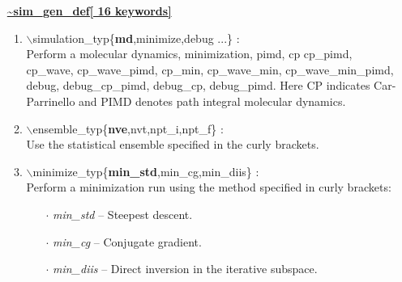 \documentclass[12pt]{article}
\begin{document}
\begin{itemize}
\huge
\item[] \underline{\bf \~{}sim\_gen\_def[ 16 keywords]}
\begin{enumerate}
 \vspace{0.15in} \Large
 \item $\backslash$simulation\_typ\{{\bf md},minimize,debug ...\} : \\
     \large
     Perform a molecular dynamics, minimization, pimd, cp
     cp\_pimd, cp\_wave, cp\_wave\_pimd, cp\_min, cp\_wave\_min,
     cp\_wave\_min\_pimd,
     debug, debug\_cp\_pimd, debug\_cp, debug\_pimd. Here CP indicates
     Car-Parrinello and PIMD  denotes path integral molecular dynamics.

 \vspace{0.15in} \Large
 \item  $\backslash$ensemble\_typ\{{\bf nve},nvt,npt\_i,npt\_f\} : \\
     \large
     Use the statistical ensemble specified in the curly brackets.

 \vspace{0.15in} \Large
 \item  $\backslash$minimize\_typ\{{\bf min\_std},min\_cg,min\_diis\} : \\
     \large
     Perform a minimization run using the method specified in curly brackets:
     \begin{itemize}
        \item[$\cdot$] {\it min\_std} -- Steepest descent.
        \item[$\cdot$] {\it min\_cg} -- Conjugate gradient.
        \item[$\cdot$] {\it min\_diis} -- Direct inversion in the 
                                          iterative subspace.
     \end{itemize}


\end{enumerate}
\end{itemize}
\end{document}
